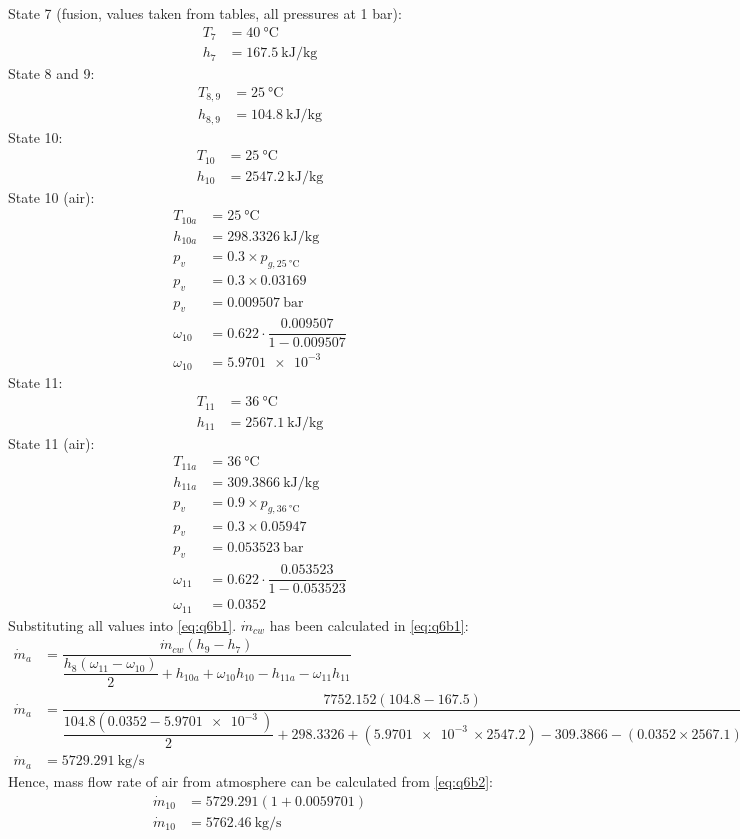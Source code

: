 \documentclass[11pt]{article}
\numberwithin{equation}{section}
\begin{document}
State 7 (fusion, values taken from tables, all pressures at 1 bar):
\begin{align}
    T_7 &= \SI{40}{\celsius}\\
    h_7 &= \SI{167.5}{\kilo\joule\per\kg}
\end{align}
State 8 and 9:
\begin{align}
    T_{8,9} &= \SI{25}{\celsius}\\
    h_{8,9} &= \SI{104.8}{\kilo\joule\per\kg}
\end{align}
State 10:
\begin{align}
    T_{10} &= \SI{25}{\celsius}\\
    h_{10} &= \SI{2547.2}{\kilo\joule\per\kg}
\end{align}
State 10 (air):
\begin{align}
    T_{10a} &= \SI{25}{\celsius}\\
    h_{10a} &= \SI{298.3326}{\kilo\joule\per\kg}\\
    p_v &= 0.3 \times p_{g,\SI{25}{\celsius}}\\
    p_v &= 0.3 \times 0.03169\\
    p_v &= \SI{0.009507}{\bar}\\
    \omega_{10} &= 0.622 \cdot \dfrac{0.009507}{1 - 0.009507}\\
    \omega_{10} &= \SI{5.9701e-3}{}
\end{align}
State 11:
\begin{align}
    T_{11} &= \SI{36}{\celsius}\\
    h_{11} &= \SI{2567.1}{\kilo\joule\per\kg}
\end{align}
State 11 (air):
\begin{align}
    T_{11a} &= \SI{36}{\celsius}\\
    h_{11a} &= \SI{309.3866}{\kilo\joule\per\kg}\\
    p_v &= 0.9 \times p_{g,\SI{36}{\celsius}}\\
    p_v &= 0.3 \times 0.05947\\
    p_v &= \SI{0.053523}{\bar}\\
    \omega_{11} &= 0.622 \cdot \dfrac{0.053523}{1 - 0.053523}\\
    \omega_{11} &= \SI{0.0352}{}
\end{align}
Substituting all values into \ref{eq:q6b1}. $\dot{m}_{cw}$ has been calculated in \ref{eq:q6b1}:
\begin{align}
    \dot{m}_a &= \dfrac{\dot{m}_{cw} \left(h_9 - h_7\right)}{\dfrac{h_8 \left(\omega_{11}- \omega_{10}\right)}{2} + h_{10a} + \omega_{10}h_{10}- h_{11a} - \omega_{11}h_{11}}\\
    \dot{m}_a &= \dfrac{7752.152\left(104.8-167.5\right)}{\dfrac{104.8\left(0.0352-\SI{5.9701e-3}{}\right)}{2} + 298.3326 + \left(\SI{5.9701e-3}{}\times 2547.2\right) - 309.3866 - \left(0.0352 \times 2567.1\right)}\\
    \dot{m}_{a} &= \SI{5729.291}{\kg\per\second}
\end{align}
Hence, mass flow rate of air from atmosphere can be calculated from \ref{eq:q6b2}:
\begin{align}
    \dot{m}_{10} &= 5729.291 \left(1 + 0.0059701\right)\\
    \dot{m}_{10} &= \SI{5762.46}{\kg\per\second}
\end{align}
\end{document}
